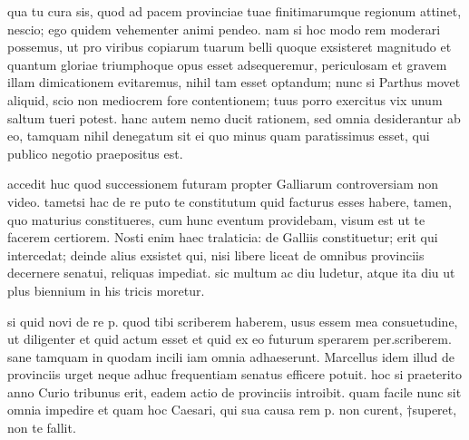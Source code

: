 


 qua tu cura sis, quod ad pacem provinciae tuae finitimarumque regionum attinet, nescio; ego quidem vehementer animi pendeo. nam si hoc modo rem moderari possemus, ut pro viribus copiarum tuarum belli quoque exsisteret magnitudo et quantum gloriae triumphoque opus esset adsequeremur, periculosam et gravem illam dimicationem evitaremus, nihil tam esset optandum; nunc si Parthus movet aliquid, scio non mediocrem fore contentionem; tuus porro exercitus vix unum saltum tueri potest. hanc autem nemo ducit rationem, sed omnia desiderantur ab eo, tamquam nihil denegatum sit ei quo minus quam paratissimus esset, qui publico negotio praepositus est.

 accedit huc quod successionem futuram propter Galliarum controversiam non video. tametsi hac de re puto te constitutum quid facturus esses habere, tamen, quo maturius constitueres, cum hunc eventum providebam, visum est ut te facerem certiorem. Nosti enim haec tralaticia: de Galliis constituetur; erit qui intercedat; deinde alius exsistet qui, nisi libere liceat de omnibus provinciis decernere senatui, reliquas impediat. sic multum ac diu ludetur, atque ita diu ut plus biennium in his tricis moretur.

 si quid novi de re p. quod tibi scriberem haberem, usus essem mea consuetudine, ut diligenter et quid actum esset et quid ex eo futurum sperarem per.scriberem. sane tamquam in quodam incili iam omnia adhaeserunt. Marcellus idem illud de provinciis urget neque adhuc frequentiam senatus efficere potuit. hoc si praeterito anno Curio tribunus erit, eadem actio de provinciis introibit. quam facile nunc sit omnia impedire et quam hoc Caesari, qui sua causa rem p. non curent, †superet, non te fallit.
